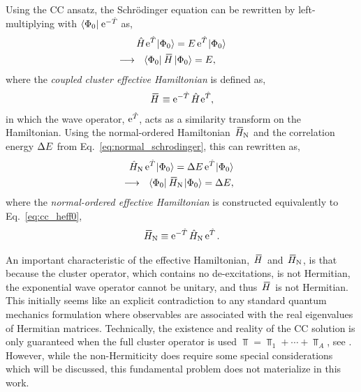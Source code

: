 \documentclass[thesis.tex]{subfiles}
\begin{document}
Using the CC ansatz, the Schr\"odinger equation can be rewritten by left-multiplying with $\langle \Phi_{0} |\hspace{1pt} \operatorname{e}^{-\hat{T}\hspace{-0.25pt}}$ as,
\begin{gather} \label{eq:cc_schrodeq}
  \Ham \E^{\Top} \refket = E \E^{\Top} \refket \notag \\
  \hspace{-1.0cm}\longrightarrow \ \ \refbra\EHam\refket = E,
\end{gather}
where the \textit{coupled cluster effective Hamiltonian} is defined as,
\begin{align} \label{eq:cc_heff0}
  \EHam \equiv \E^{-\Top} \Ham \E^{\Top},
\end{align}
in which the wave operator, $\operatorname{e}^{\hat{T}\hspace{-0.25pt}}$, acts as a similarity transform on the Hamiltonian.  Using the normal-ordered Hamiltonian $\EHamN$ and the correlation energy $\Delta E$ from Eq.\ \eqref{eq:normal_schrodinger}, this can rewritten as,
\begin{align} \label{eq:cc_heff1}
  \HamN \E^{\Top} \refket = \Ecorr \E^{\Top} \refket \notag \\
  \hspace{-1.0cm}\longrightarrow \ \ \refbra\EHamN\refket = \Ecorr,
\end{align}
where the \textit{normal-ordered effective Hamiltonian} is constructed equivalently to Eq.\ \eqref{eq:cc_heff0},
\begin{align} \label{eq:cc_heff0}
  \EHamN \equiv \E^{-\Top} \HamN \E^{\Top}.
\end{align}

An important characteristic of the effective Hamiltonian, $\EHam$ and $\EHamN$, is that because the cluster operator, which contains no de-excitations, is not Hermitian, the exponential wave operator cannot be unitary, and thus $\EHam$ is not Hermitian.  This initially seems like an explicit contradiction to any standard quantum mechanics formulation where observables are associated with the real eigenvalues of Hermitian matrices. Technically, the existence and reality of the CC solution is only guaranteed when the full cluster operator is used $\Top = \Top_{1} + \cdots + \Top_{A}$, see \cite{ZIVKOVIC1977,MOISEYEV2011}.  However, while the non-Hermiticity does require some special considerations which will be discussed, this fundamental problem does not materialize in this work.
\end{document}
